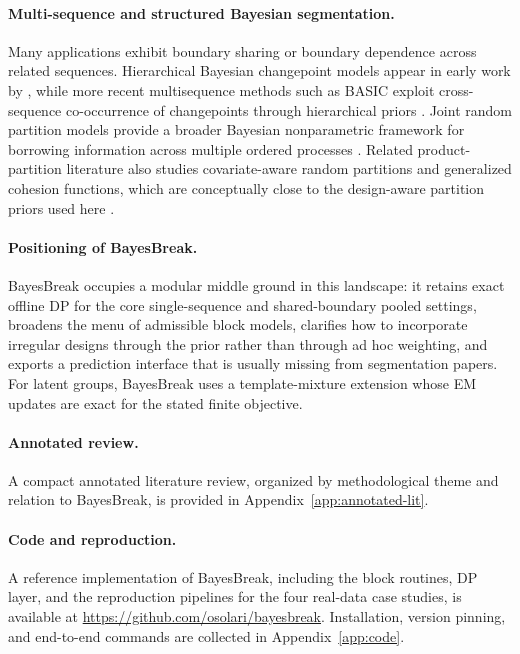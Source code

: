 \paragraph{Multi-sequence and structured Bayesian segmentation.}
Many applications exhibit boundary sharing or boundary dependence across related sequences.
Hierarchical Bayesian changepoint models appear in early work by \citet{carlin1992hierBayesCP},
while more recent multisequence methods such as BASIC exploit cross-sequence co-occurrence of
changepoints through hierarchical priors \citep{fan2017basic}. Joint random partition models
provide a broader Bayesian nonparametric framework for borrowing information across multiple
ordered processes \citep{quinlan2024jrpm}. Related product-partition literature also studies
covariate-aware random partitions and generalized cohesion functions, which are conceptually close
to the design-aware partition priors used here \citep{muller2011ppmx, park2010gppm}.

\paragraph{Positioning of BayesBreak.}
BayesBreak occupies a modular middle ground in this landscape: it retains exact offline DP for the core single-sequence and
shared-boundary pooled settings, broadens the menu of admissible block models, clarifies how to
incorporate irregular designs through the prior rather than through ad hoc weighting, and exports a
prediction interface that is usually missing from segmentation papers. For latent groups, BayesBreak
uses a template-mixture extension whose EM updates are exact for the stated finite objective.

\paragraph{Annotated review.}
A compact annotated literature review, organized by methodological theme and relation to
BayesBreak, is provided in Appendix~\ref{app:annotated-lit}.

\paragraph{Code and reproduction.}
A reference implementation of BayesBreak, including the block routines, DP layer, and the
reproduction pipelines for the four real-data case studies, is available at
\url{https://github.com/osolari/bayesbreak}. Installation, version pinning, and end-to-end
commands are collected in Appendix~\ref{app:code}.

